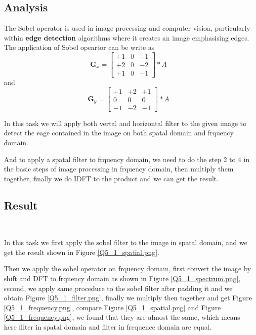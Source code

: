 \documentclass[
	12pt, %
]{style/fphw}
\begin{document}
\subsection*{Analysis}

The Sobel operator is used in image processing and computer vision, particularly within \textbf{edge detection} algorithms where it creates an image emphasising edges. The application of Sobel opeartor can be write as $$ \textbf{G}_x = \left[\begin{array}{ccc}
    +1 & 0 & -1 \\
    +2 & 0 & -2 \\
    +1 & 0 & -1 
\end{array}\right] \ast A $$ and $$ \textbf{G}_y = \left[\begin{array}{ccc}
    +1 & +2 & +1 \\
    0 & 0 & 0 \\
    -1 & -2 & -1 
\end{array}\right] \ast A $$

In this task we will apply both vertal and horizontal filter to the given image to detect the eage contained in the image on both spatal domain and frquency domain.

And to apply a spatal filter to frquency domain, we need to do the step 2 to 4 in the basic steps of image processing in frquency domain, then multiply them together, finally we do IDFT to the product and we can get the result.

\subsection*{Result} \

In this task we first apply the sobel filter to the image in spatal domain, and we get the result shown in Figure \ref{Q5_1_spatial.png}.

Then we apply the sobel operator on frquency domain, first convert the image by shift and DFT to frquency domain as shown in Figure \ref{Q5_1_spectrum.png}, second, we apply same procedure to the sobel filter after padding it and we obtain Figure \ref{Q5_1_filter.png}, finally we multiply then together and get Figure \ref{Q5_1_frequency.png}, compare Figure \ref{Q5_1_spatial.png} and Figure \ref{Q5_1_frequency.png}, we found that they are almost the same, which means here filter in spatal domain and filter in frequence domain are equal.
 
\end{document}
